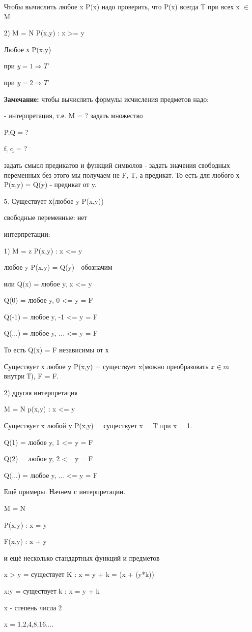 \documentclass{article}
\begin{document}
Чтобы вычислить любое x P(x) надо проверить, что P(x) всегда T при всех x $\in$ M

2) M = N P(x,y) : x >= y

Любое х P(x,y)

при $y = 1 \Longrightarrow T$

при $y = 2 \Longrightarrow T$

\textbf{Замечание:}
чтобы вычислить формулы исчисления предметов надо:

- интерпретация, т.е. M = ? задать множество 

P,Q = ?

f, q = ?

задать смысл предикатов и функций символов - задать значения свободных переменных без этого мы получаем не F, T, а предикат. То есть для любого х P(x,y) = Q(y) - предикат от y.

5. Существует х(любое y P(x,y))

свободные переменные: нет

интерпретации:

1) M = z P(x,y) : x <= y

любое y P(x,y) = Q(y) - обозначим

или Q(x) = любое y, x <= y

Q(0) = любое y, 0 <= y = F

Q(-1) = любое y, -1 <= y = F

Q(...) = любое y, ... <= y = F

То есть Q(x) = F независимы от х

Существует х любое y P(x,y) = существует x(можно преобразовать $x \in m$ внутри Т), F = F.

2) другая интерпретация

M = N p(x,y) : x <= y

Существует x любой y P(x,y) = существует x = T при x = 1.

Q(1) = любое y, 1 <= y = F

Q(2) = любое y, 2 <= y = F

Q(...) = любое y, ... <= y = F

Ещё примеры. Начнем с интерпретации. 

M = N

P(x,y) : x = y

F(x,y) : x + y

и ещё несколько стандартных функций и предметов

x > y = существует K : x = y + k = (x + (y*k))

x:y = существует k : x = y + k

x - степень числа 2

x = 1,2,4,8,16,...
\end{document}
